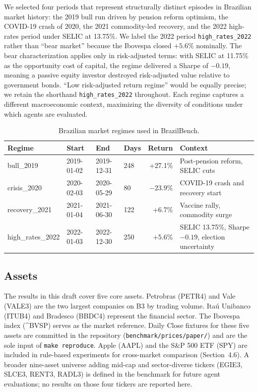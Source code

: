 \documentclass{article}
\begin{document}
We selected four periods that represent structurally distinct episodes
in Brazilian market history: the 2019 bull run driven by pension reform
optimism, the COVID-19 crash of 2020, the 2021 commodity-led recovery,
and the 2022 high-rates period under SELIC at 13.75\%. We label the
2022 period \texttt{high\_rates\_2022} rather than ``bear market''
because the Ibovespa closed $+5.6\%$ nominally. The bear
characterization applies only in risk-adjusted terms: with SELIC at
11.75\% as the opportunity cost of capital, the regime delivered a
Sharpe of $-0.19$, meaning a passive equity investor destroyed
risk-adjusted value relative to government bonds. ``Low
risk-adjusted return regime'' would be equally precise; we retain the
shorthand \texttt{high\_rates\_2022} throughout. Each regime captures
a different macroeconomic context, maximizing the diversity of
conditions under which agents are evaluated.

\begin{table}[h]
\centering
\caption{Brazilian market regimes used in BrazilBench.}
\label{tab:regimes}
\begin{tabular}{llllrp{4cm}}
\toprule
\textbf{Regime} & \textbf{Start} & \textbf{End} & \textbf{Days}
  & \textbf{Return} & \textbf{Context} \\
\midrule
bull\_2019        & 2019-01-02 & 2019-12-31 & 248 & +27.1\%
  & Post-pension reform, SELIC cuts \\
crisis\_2020      & 2020-02-03 & 2020-05-29 &  80 & $-23.9\%$
  & COVID-19 crash and recovery start \\
recovery\_2021    & 2021-01-04 & 2021-06-30 & 122 & +6.7\%
  & Vaccine rally, commodity surge \\
high\_rates\_2022 & 2022-01-03 & 2022-12-30 & 250 & +5.6\%
  & SELIC 13.75\%, Sharpe $-0.19$, election uncertainty \\
\bottomrule
\end{tabular}
\end{table}

\subsection{Assets}

The results in this draft cover five core assets. Petrobras (PETR4)
and Vale (VALE3) are the two largest companies on B3 by trading
volume. Itaú Unibanco (ITUB4) and Bradesco (BBDC4) represent the
financial sector. The Ibovespa index (\textasciicircum BVSP) serves
as the market reference. Daily Close fixtures for these five assets
are committed in the repository (\texttt{benchmark/prices/paper/})
and are the sole input of \texttt{make reproduce}. Apple (AAPL) and
the S\&P 500 ETF (SPY) are included in rule-based experiments for
cross-market comparison (Section~4.6). A broader nine-asset universe
adding mid-cap and sector-diverse tickers (EGIE3, SLCE3, RENT3,
RADL3) is defined in the benchmark for future agent evaluations; no
results on those four tickers are reported here.
\end{document}
